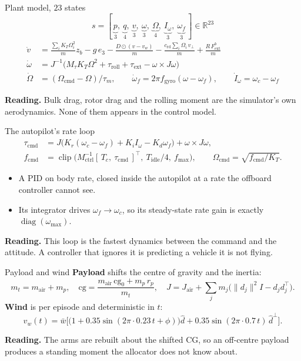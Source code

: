 \documentclass[10pt]{beamer}
\newcommand{\takeaway}[1]{\par\vfill{\footnotesize\textbf{Reading.} #1\par}}
\begin{document}
\begin{frame}{Plant model, $23$ states}
  \[
    s=[\,\underbrace{p}_{3},\ \underbrace{q}_{4},\ \underbrace{v}_{3},\
        \underbrace{\omega}_{3},\ \underbrace{\Omega}_{4},\
        \underbrace{I_\omega}_{3},\ \underbrace{\omega_f}_{3}\,]\in\mathbb{R}^{23}
  \]
  \small
  \begin{align*}
    \dot v &= \frac{\sum_iK_T\Omega_i^{2}}{m}z_b-g\,e_3
      -\frac{D\odot(v-v_w)}{m}
      -\frac{c_{\mathrm{rd}}\sum_i\Omega_i\,v_\perp}{m}
      +\frac{R\,F^{b}_{\mathrm{ext}}}{m}\\
    \dot\omega &= J^{-1}\big(M_\tau K_T\Omega^{2}+\tau_{\mathrm{roll}}
      +\tau_{\mathrm{ext}}-\omega\times J\omega\big)\\
    \dot\Omega &= (\Omega_{\mathrm{cmd}}-\Omega)/\tau_m,\qquad
    \dot\omega_f = 2\pi f_{\mathrm{gyro}}(\omega-\omega_f),\qquad
    \dot I_\omega = \omega_c-\omega_f
  \end{align*}
  \normalsize
  \takeaway{Bulk drag, rotor drag and the rolling moment are the simulator's
    own aerodynamics. None of them appears in the control model.}
\end{frame}

\begin{frame}{The autopilot's rate loop}
  \begin{align*}
    \tau_{\mathrm{cmd}} &= J\big(K_r(\omega_c-\omega_f)+K_iI_\omega
      -K_d\omega_f\big)+\omega\times J\omega,\\
    f_{\mathrm{cmd}} &= \operatorname{clip}\big(M_{\mathrm{ctrl}}^{-1}
      [\,T_c,\ \tau_{\mathrm{cmd}}\,]^{\!\top},\
      T_{\mathrm{idle}}/4,\ f_{\max}\big),\qquad
    \Omega_{\mathrm{cmd}}=\sqrt{f_{\mathrm{cmd}}/K_T}.
  \end{align*}
  \begin{itemize}
    \item A PID on body rate, closed inside the autopilot at a rate the
      offboard controller cannot see.
    \item Its integrator drives $\omega_f\to\omega_c$, so its steady-state
      rate gain is exactly $\operatorname{diag}(\omega_{\max})$.
  \end{itemize}
  \takeaway{This loop is the fastest dynamics between the command and the
    attitude. A controller that ignores it is predicting a vehicle it is not
    flying.}
\end{frame}

\begin{frame}{Payload and wind}
  \textbf{Payload} shifts the centre of gravity and the inertia:
  {\small
  \[
    m_t=m_{\mathrm{air}}+m_p,\quad
    \mathrm{cg}=\frac{m_{\mathrm{air}}\,\mathrm{cg}_0+m_p\,r_p}{m_t},\quad
    J=J_{\mathrm{air}}+\sum_j m_j\big(\|d_j\|^{2}I-d_jd_j^{\!\top}\big).
  \]}
  \textbf{Wind} is per episode and deterministic in $t$:
  \[
    v_w(t)=\bar w\Big[\big(1+0.35\sin(2\pi\cdot0.23\,t+\phi)\big)\hat d
      +0.35\sin(2\pi\cdot0.7\,t)\,\hat d^{\perp}\Big].
  \]
  \takeaway{The arms are rebuilt about the shifted CG, so an off-centre
    payload produces a standing moment the allocator does not know about.}
\end{frame}
\end{document}
